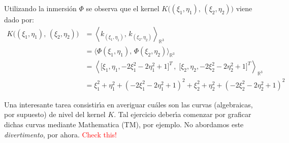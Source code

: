\begin{center}
\end{center}



\smallskip\noindent
Utilizando la inmersi\'on $\Phi$ se observa que el kernel
$K\big( (\xi_1,\eta_1),\,(\xi_2,\eta_2) \big)$ viene dado por:
\begin{align*}
K\big( (\xi_1,\eta_1),\,(\xi_2,\eta_2) \big)
&= \left\langle k_{(\xi_1,\eta_1)},\,k_{(\xi_2,\eta_2)}
   \right\rangle_{\mathbb{R}^3} \\
&= \big\langle \Phi(\xi_1,\eta_1),\,\Phi(\xi_2,\eta_2)
   \big\rangle_{\mathbb{R}^3} \\
&= \left\langle \big[\xi_1,\eta_1,-2\xi_1^2-2\eta_1^2+1\big]^T\,,\;
   \big[\xi_2,\eta_2,-2\xi_2^2-2\eta_2^2+1\big]^T
   \right\rangle_{\mathbb{R}^3} \\
&= \xi_1^2 + \eta_1^2 + \left(-2\xi_1^2-2\eta_1^2+1\right)^2 +
   \xi_2^2 + \eta_2^2 + \left(-2\xi_2^2-2\eta_2^2+1\right)^2
\end{align*} 





Una interesante tarea consistir\'\i a en averiguar cu\'ales son
las curvas (algebraicas, por supuesto) de nivel del kernel $K$.
Tal ejercicio deber\'\i a comenzar por graficar dichas curvas
mediante Mathematica (TM), por ejemplo.
No abordamos este {\em divertimento\/}, por ahora. \textcolor{red}{Check this!}



